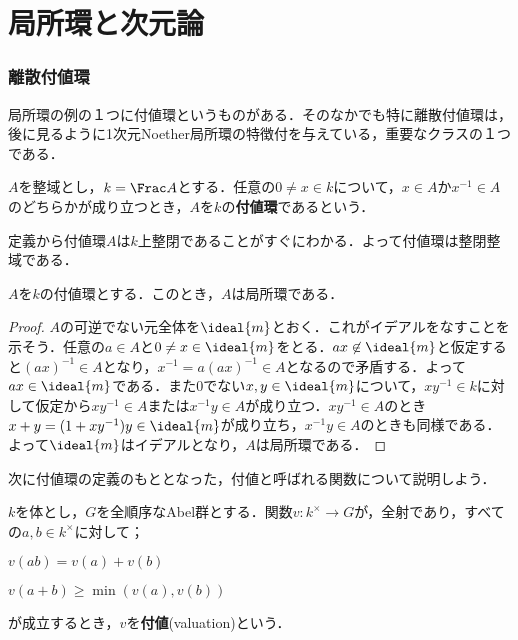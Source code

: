 \newpage
\part[Local ring and Dimension theory]{局所環と次元論}

\section{離散付値環}

局所環の例の１つに付値環というものがある．そのなかでも特に離散付値環は，後に見るように1次元Noether局所環の特徴付を与えている，重要なクラスの１つである．

\begin{defi}[付値環]
	$A$を整域とし，$k=\Frac A$とする．任意の$0\neq x\in k$について，$x\in A$か$x^{-1}\in A$のどちらかが成り立つとき，$A$を$k$の\textbf{付値環}であるという．
\end{defi}

定義から付値環$A$は$k$上整閉であることがすぐにわかる．よって付値環は整閉整域である．

\begin{prop}
	$A$を$k$の付値環とする．このとき，$A$は局所環である．
\end{prop}

\begin{proof}
	$A$の可逆でない元全体を$\ideal{m}$とおく．これがイデアルをなすことを示そう．任意の$a\in A$と$0\neq x\in\ideal{m}$をとる．$ax\not\in\ideal{m}$と仮定すると$(ax)^{-1}\in A$となり，$x^{-1}=a(ax)^{-1}\in A$となるので矛盾する．よって$ax\in \ideal{m}$である．また$0$でない$x,y\in\ideal{m}$について，$xy^{-1}\in k$に対して仮定から$xy^{-1}\in A$または$x^{-1}y\in A$が成り立つ．$xy^{-1}\in A$のとき$x+y=(1+xy^{-1})y\in \ideal{m}$が成り立ち，$x^{-1}y\in A$のときも同様である．よって$\ideal{m}$はイデアルとなり，$A$は局所環である．
\end{proof}

次に付値環の定義のもととなった，付値と呼ばれる関数について説明しよう．

\begin{defi}[付値]
	$k$を体とし，$G$を全順序なAbel群とする．関数$v:k^\times\to G$が，全射であり，すべての$a,b\in k^\times$に対して；
	\begin{sakura}
		\item $v(ab)=v(a)+v(b)$
		\item $v(a+b)\geq\min (v(a),v(b))$
	\end{sakura}
	が成立するとき，$v$を\textbf{付値}(valuation)という．
\end{defi}

